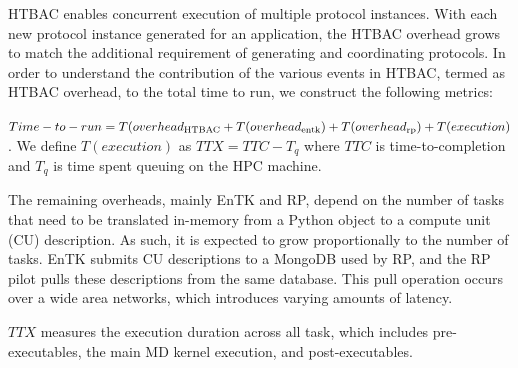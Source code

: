 HTBAC enables concurrent execution of multiple protocol instances.
With each new protocol instance generated for an
application, the HTBAC overhead grows to match the additional
requirement of generating and coordinating protocols. In order
to understand the contribution of the various events in HTBAC,
termed as HTBAC overhead, to the total time to run, we construct the following metrics:

\(Time-to-run = T(overhead\textsubscript{HTBAC} +
T(overhead\textsubscript{entk}) +
T(overhead\textsubscript{rp}) + T(execution)\). We define \(T(execution)\) as \(TTX = TTC - T_q\) where \(TTC\) is
time-to-completion and \(T_q\) is time spent queuing on the HPC machine.


The remaining overheads, mainly EnTK and RP, depend on the number of tasks
that need to be translated in-memory from a Python object to a compute unit
(CU) description. As such, it is expected to grow proportionally to the number
of tasks. EnTK submits CU descriptions to a MongoDB used by RP, and the RP
pilot pulls these descriptions from the same database. This pull operation
occurs over a wide area networks, which introduces varying amounts of latency.

\(TTX\) measures the execution duration across all task, which includes pre-
executables, the main MD kernel execution, and post-executables.
